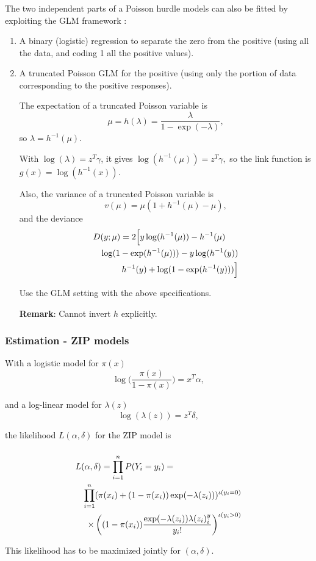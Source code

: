 \documentclass{beamer}
\newcommand{\bs}{\bigskip}
\begin{document}
\begin{frame}[allowframebreaks]
\frametitle{}
The two independent parts of a Poisson hurdle models can also be fitted by exploiting the GLM
framework \cite{Barr:Wels:2002}:

\begin{enumerate}
\item A binary (logistic) regression to separate the zero from the positive
(using all the data, and coding 1 all the positive values). 

\item A truncated Poisson GLM for the positive (using only the portion of data
corresponding to the positive responses).

\bs 
The expectation of a truncated Poisson variable is
$$\mu = h(\lambda) = \frac{\lambda}{1-\exp(-\lambda)},$$
so $\lambda=h^{-1}(\mu)$.

\bs With $\log(\lambda) = z^T \gamma $, it gives $\log(h^{-1}(\mu)) = z^T \gamma,$ 
so the link function is $g(x) = \log(h^{-1}(x))$.

Also, the variance of a truncated Poisson variable is
$$v(\mu) = \mu (1 + h^{-1}(\mu) -\mu),$$
and the deviance
\begin{eqnarray*}
\lefteqn{D(y;\mu) = 2 \Big[ y \log(h^{-1}(\mu)) - h^{-1}(\mu)} \\
 & & \log(1-\exp(h^{-1}(\mu))) - y \log(h^{-1}(y)) \\
 & & h^{-1}(y) + \log(1-\exp(h^{-1}(y))) \Big]
\end{eqnarray*}

\label{truncpoisdef}
Use the GLM setting with the above specifications.

 \bs \textbf{Remark}: Cannot invert $h$ explicitly.
\end{enumerate}

\end{frame}

\begin{frame}
\frametitle{Estimation - ZIP models}

With a logistic model for $\pi(x)$
$$\log \Big(\frac{ \pi(x)}{1-\pi(x)} \Big) = x^T
\alpha,$$

and a log-linear model for $\lambda(z)$
$$\log(\lambda(z)) = z^T \delta,$$

\bs the likelihood $L(\alpha,\delta)$ for the ZIP model is
\end{frame}

\begin{frame}
\frametitle{}
\begin{eqnarray*}
\lefteqn{L(\alpha,\delta) = \prod_{i=1}^n P(Y_i = y_i) = }\\
&&\prod_{i=1}^n (\pi(x_i) +(1-\pi(x_i))\exp(-\lambda(z_i)))^{\iota(y_i=0)}
 \\
&& \times \left( (1-\pi(x_i))\frac{\exp(-\lambda(z_i))
\lambda(z_i)^y_i}{y_i!} \right)^{\iota(y_i>0)}
\end{eqnarray*}

\bs
This likelihood has to be maximized jointly for $(\alpha,\delta)$.

\end{frame}
\end{document}
